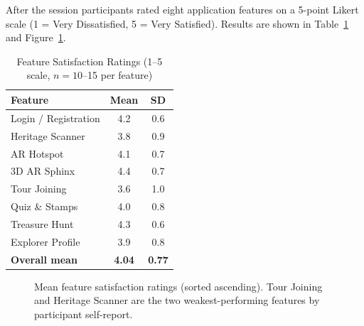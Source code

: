 After the session participants rated eight application features on a 5-point Likert
scale (1 = Very Dissatisfied, 5 = Very Satisfied). Results are shown in
Table~\ref{tab:satisfaction} and Figure~\ref{fig:satisfaction-bar}.

\begin{table}[htbp]
  \centering
  \caption{Feature Satisfaction Ratings (1--5 scale, $n=10$--15 per feature)}
  \label{tab:satisfaction}
  \begin{tabular}{lcc}
    \toprule
    \textbf{Feature}         & \textbf{Mean} & \textbf{SD} \\
    \midrule
    Login / Registration     & 4.2           & 0.6 \\
    Heritage Scanner         & 3.8           & 0.9 \\
    AR Hotspot               & 4.1           & 0.7 \\
    3D AR Sphinx             & 4.4           & 0.7 \\
    Tour Joining             & 3.6           & 1.0 \\
    Quiz \& Stamps           & 4.0           & 0.8 \\
    Treasure Hunt            & 4.3           & 0.6 \\
    Explorer Profile         & 3.9           & 0.8 \\
    \midrule
    \textbf{Overall mean}    & \textbf{4.04} & \textbf{0.77} \\
    \bottomrule
  \end{tabular}
\end{table}

\begin{figure}[htbp]
  \centering
  \caption{Mean feature satisfaction ratings (sorted ascending). Tour Joining and
  Heritage Scanner are the two weakest-performing features by participant
  self-report.}
  \label{fig:satisfaction-bar}
\end{figure}

